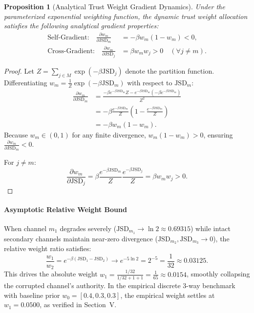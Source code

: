 \documentclass[conference]{IEEEtran}
\newtheorem{proposition}{Proposition}
\begin{document}
\begin{proposition}[Analytical Trust Weight Gradient Dynamics]
Under the parameterized exponential weighting function, the dynamic trust weight allocation satisfies the following analytical gradient properties:
\begin{align}
\text{Self-Gradient:} \quad \frac{\partial w_m}{\partial \mathrm{JSD}_m} &= -\beta w_m (1 - w_m) < 0, \label{eq:self_grad} \\
\text{Cross-Gradient:} \quad \frac{\partial w_m}{\partial \mathrm{JSD}_j} &= \beta w_m w_j > 0 \quad (\forall j \neq m). \label{eq:cross_grad}
\end{align}
\end{proposition}

\begin{proof}
Let $Z = \sum_{j \in M} \exp(-\beta \mathrm{JSD}_j)$ denote the partition function. Differentiating $w_m = \frac{1}{Z}\exp(-\beta \mathrm{JSD}_m)$ with respect to $\mathrm{JSD}_m$:
\begin{align}
\frac{\partial w_m}{\partial \mathrm{JSD}_m} &= \frac{-\beta e^{-\beta \mathrm{JSD}_m} Z - e^{-\beta \mathrm{JSD}_m}(-\beta e^{-\beta \mathrm{JSD}_m})}{Z^2} \nonumber \\
&= -\beta \frac{e^{-\beta \mathrm{JSD}_m}}{Z} \left( 1 - \frac{e^{-\beta \mathrm{JSD}_m}}{Z} \right) \nonumber \\
&= -\beta w_m (1 - w_m).
\end{align}
Because $w_m \in (0, 1)$ for any finite divergence, $w_m(1 - w_m) > 0$, ensuring $\frac{\partial w_m}{\partial \mathrm{JSD}_m} < 0$. 

For $j \neq m$:
\begin{equation}
\frac{\partial w_m}{\partial \mathrm{JSD}_j} = \beta \frac{e^{-\beta \mathrm{JSD}_m}}{Z} \frac{e^{-\beta \mathrm{JSD}_j}}{Z} = \beta w_m w_j > 0.
\end{equation}
\end{proof}

\paragraph{Asymptotic Relative Weight Bound} When channel $m_1$ degrades severely ($\mathrm{JSD}_{m_1} \to \ln 2 \approx 0.69315$) while intact secondary channels maintain near-zero divergence ($\mathrm{JSD}_{m_2}, \mathrm{JSD}_{m_3} \to 0$), the relative weight ratio satisfies:
\begin{equation}
\frac{w_1}{w_2} = e^{-\beta (\mathrm{JSD}_1 - \mathrm{JSD}_2)} \to e^{-5 \ln 2} = 2^{-5} = \frac{1}{32} \approx 0.03125.
\end{equation}
This drives the absolute weight $w_1 = \frac{1/32}{1/32 + 1 + 1} = \frac{1}{65} \approx 0.0154$, smoothly collapsing the corrupted channel's authority. In the empirical discrete 3-way benchmark with baseline prior $w_0 = [0.4, 0.3, 0.3]$, the empirical weight settles at $w_1 = 0.0500$, as verified in Section~V.
\end{document}
